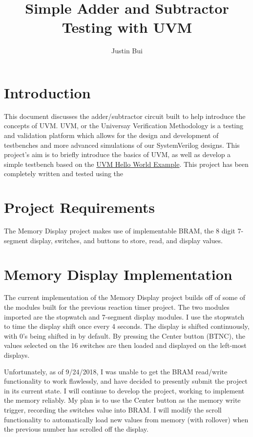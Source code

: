 \documentclass{article}
\author{Justin Bui}
\title{Simple Adder and Subtractor Testing with UVM}
\begin{document}
\maketitle
\newpage

\tableofcontents
\newpage

\section{Introduction}
This document discusses the adder/subtractor circuit built to help introduce the concepts of UVM. UVM, or the Universay Verification Methodology is a testing and validation platform which allows for the design and development of testbenches and more advanced simulations of our SystemVerilog designs. This project's aim is to briefly introduce the basics of UVM, as well as develop a simple testbench based on the \href{https://www.edaplayground.com/x/296}{UVM Hello World Example}. This project has been completely written and tested using the 


\section{Project Requirements}
The Memory Display project makes use of implementable BRAM, the 8 digit 7-segment display, switches, and buttons to store, read, and display values. 

\section{Memory Display Implementation}
The current implementation of the Memory Display project builds off of some of the modules built for the previous reaction timer project. The two modules imported are the stopwatch and 7-segment display modules. I use the stopwatch to time the display shift once every 4 seconds. The display is shifted continuously, with 0's being shifted in by default. By pressing the Center button (BTNC), the values selected on the 16 switches are then loaded and displayed on the left-most displays. 

Unfortunately, as of 9/24/2018, I was unable to get the BRAM read/write functionality to work flawlessly, and have decided to presently submit the project in its current state. I will continue to develop the project, working to implement the memory reliably. My plan is to use the Center button as the memory write trigger, recording the switches value into BRAM. I will modify the scroll functionality to automatically load new values from memory (with rollover) when the previous number has scrolled off the display.
\end{document}
